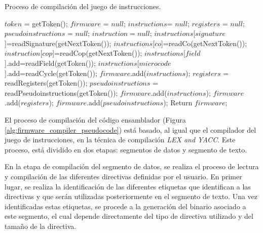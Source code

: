 \clearpage

\begin{algorithm}[h]
	\caption{Proceso de compilación del juego de instrucciones.}
	\label{alg:firmware_compiler_pseudocode}
  	\scriptsize
	\begin{algorithmic}[1]
		\State $token$ = getToken();
		\State $firmware$ = $null$;
		\State $instructions $= $null$;
		\State $registers$ = $null$;
		\State $pseudoinstructions$ = $null$;
			\State $instruction = null$;
			\State $instructions$[$signature$]=readSignature(getNextToken());
			\State $instructions$[$co$]=readCo(getNextToken());
				\State $instruction$[$cop$]=readCop(getNextToken());
			\EndIf
				\State $instructions$[$field$].add=readField(getToken());
			\EndWhile
				\State $instructions$[$microcode$].add=readCycle(getToken());
			\EndWhile
			\State $firmware$.add($instructions$);
		\EndWhile
			\State $registers$ = readRegisters(getToken());
		\EndIf
			\State $pseudoinstructions$ = readPseudoinstructions(getToken());
		\EndIf
		\State $firmware$.add($instructions$);
		\State $firmware$.add($registers$);
		\State $firmware$.add($pseudoinstructions$);
		\State Return $firmware$;
		\EndFunction
	\end{algorithmic}
\end{algorithm}

\clearpage

El proceso de compilación del código ensamblador (Figura \ref{alg:firmware_compiler_pseudocode}) está basado, al igual que el compilador del juego de instrucciones, en la técnica de compilación \textit{LEX and YACC}. Este proceso, está dividido en dos etapas: segmentos de datos y segmento de texto.

En la etapa de compilación del segmento de datos, se realiza el proceso de lectura y compilación de las diferentes directivas definidas por el usuario. En primer lugar, se realiza la identificación de las diferentes etiquetas que identifican a las directivas y que serán utilizadas posteriormente en el segmento de texto. Una vez identificadas estas etiquetas, se procede a la generación del binario asociado a este segmento, el cual depende directamente del tipo de directiva utilizado y del tamaño de la directiva.

